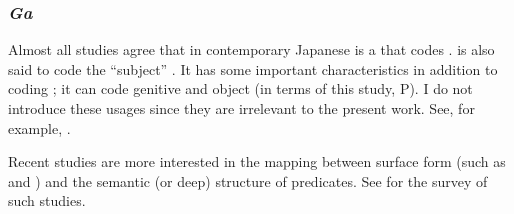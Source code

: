 \subsubsection{\textit{Ga}}

Almost all studies agree that
 in contemporary Japanese is a  that codes  \cite[e.g.,][]{yamada36,kuno73,tanaka77,shibatani90}.
 is also said to code the ``subject'' \cite[e.g.,][164]{kuroda79}.
It has some important characteristics in addition to coding ;
it can code genitive and object (in terms of this study, P).
I do not introduce these usages since they are irrelevant to the present work.
See, for example, \cite{ono75,nishida77,yasuda77,kuno73,shibatani01}.

Recent studies are more interested in the mapping between
surface form (such as  and )
and the semantic (or deep) structure of predicates.
See  for the survey of such studies.


